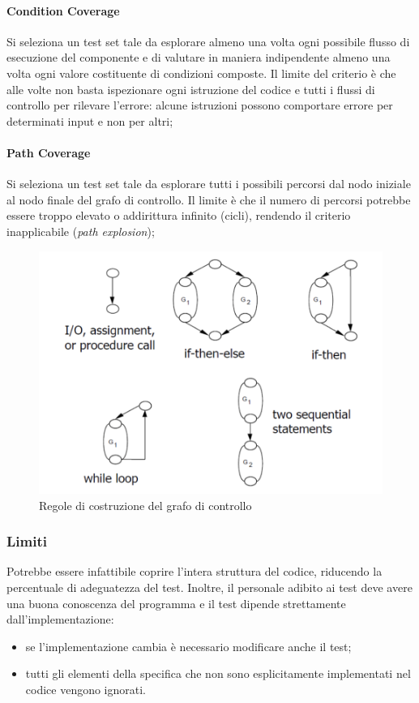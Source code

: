 \paragraph{Condition Coverage} Si seleziona un test set tale da esplorare almeno una volta ogni possibile flusso di esecuzione del componente e di valutare in maniera indipendente almeno una volta ogni valore costituente di condizioni composte. Il limite del criterio è che alle volte non basta ispezionare ogni istruzione del codice e tutti i flussi di controllo per rilevare l'errore: alcune istruzioni possono comportare errore per determinati input e non per altri; 
   
\paragraph{Path Coverage} Si seleziona un test set tale da esplorare tutti i possibili percorsi dal nodo iniziale al nodo finale del grafo di controllo. Il limite è che il numero di percorsi potrebbe essere troppo elevato o addirittura infinito (cicli), rendendo il criterio inapplicabile (\textit{path explosion});

\begin{figure}[h!]
    \centering
    \includegraphics[width=0.75\linewidth]{assets/wb-control-graph.png}
    \caption{Regole di costruzione del grafo di controllo}
    \label{fig:wb-graph}
\end{figure}

\subsubsection{Limiti}
Potrebbe essere infattibile coprire l'intera struttura del codice, riducendo la percentuale di adeguatezza del test. Inoltre, il personale adibito ai test deve avere una buona conoscenza del programma e il test dipende strettamente dall'implementazione:
\begin{itemize}
    \item se l'implementazione cambia è necessario modificare anche il test; 
    \item tutti gli elementi della specifica che non sono esplicitamente implementati nel codice vengono ignorati. 
\end{itemize}

